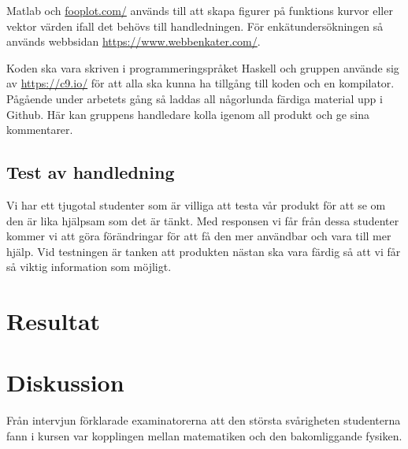 \documentclass[]{article}
\begin{document}
Matlab och \url{fooplot.com/} används till att skapa figurer på funktions kurvor eller vektor
värden ifall det behövs till handledningen. För enkätundersökningen så används webbsidan
\url{https://www.webbenkater.com/}.

Koden ska vara skriven i programmeringspråket Haskell och gruppen använde sig av \url{https://c9.io/}
för att alla ska kunna ha tillgång till koden och en kompilator.
Pågående under arbetets gång så laddas all någorlunda färdiga material upp i Github.
Här kan gruppens handledare kolla igenom all produkt och ge sina kommentarer.


\subsection{Test av handledning}

Vi har ett tjugotal studenter som är villiga att testa vår produkt för
att se om den är lika hjälpsam som det är tänkt. Med responsen vi får
från dessa studenter kommer vi att göra förändringar för att få den mer
användbar och vara till mer hjälp. Vid testningen är tanken att
produkten nästan ska vara färdig så att vi får så viktig information som
möjligt.

\section{Resultat}


%

\section{Diskussion}




Från intervjun förklarade examinatorerna att den största svårigheten studenterna fann i kursen
var kopplingen mellan matematiken och den bakomliggande fysiken. %
\end{document}
